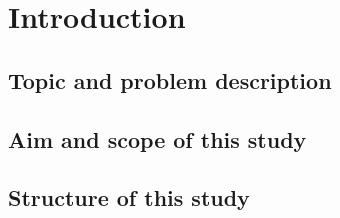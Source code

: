 \section{Introduction}


\subsection{Topic and problem description}
\subsection{Aim and scope of this study}
\subsection{Structure of this study}
